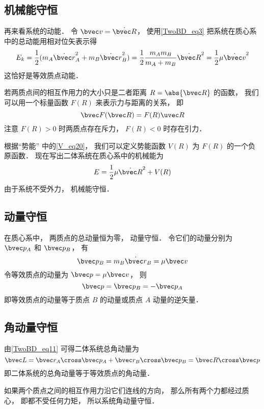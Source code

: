 \subsection{机械能守恒}

再来看系统的动能． 令 $\bvec v = \dot {\bvec R}$， 使用\autoref{TwoBD_eq3} 把系统在质心系中的总动能用相对位矢表示得
\begin{equation}
E_k = \frac12 (m_A \dot{\bvec r}_A^2 + m_B \dot{\bvec r}_B^2) = \frac12 \frac{m_A m_B}{m_A + m_B} \dot{\bvec  R}^2 = \frac12 \mu \dot{\bvec  v}^2
\end{equation}
这恰好是等效质点动能．

若两质点间的相互作用力的大小只是二者距离 $R = \abs{\bvec R}$ 的函数， 我们可以用一个标量函数 $F(R)$ 来表示力与距离的关系， 即
\begin{equation}
\bvec F(\bvec R) = F(R) \uvec R
\end{equation}
注意 $F(R)>0$ 时两质点存在斥力， $F(R)<0$ 时存在引力．

根据“势能” 中的\autoref{V_eq20}， 我们可以定义势能函数 $V(R)$ 为 $F(R)$ 的一个负原函数． 现在写出二体系统在质心系中的机械能为
\begin{equation}
E = \frac12 \mu \dot{\bvec  R}^2 + V(R)
\end{equation}
由于系统不受外力， 机械能守恒．

\subsection{动量守恒}
在质心系中， 两质点的总动量恒为零， 动量守恒． 令它们的动量分别为 $\bvec p_A$ 和 $\bvec p_B$， 有
\begin{equation}\label{TwoBD_eq10}
\bvec p_B = m_B \dot {\bvec r}_B = \mu \bvec v
\end{equation}
令等效质点的动量为 $\bvec p = \mu \bvec v$， 则
\begin{equation}\label{TwoBD_eq11}
\bvec p = \bvec p_B = -\bvec p_A
\end{equation}
即等效质点的动量等于质点 $B$ 的动量或质点 $A$ 动量的逆矢量．

\subsection{角动量守恒}

由\autoref{TwoBD_eq11} 可得二体系统总角动量为
\begin{equation}
\bvec L = \bvec r_A \cross \bvec p_A + \bvec r_B \cross \bvec p_B
= \bvec R \cross \bvec p
\end{equation}
即二体系统的总角动量等于等效质点的角动量．

如果两个质点之间的相互作用力沿它们连线的方向， 那么所有两个力都经过质心， 即都不受任何力矩， 所以系统角动量守恒．
